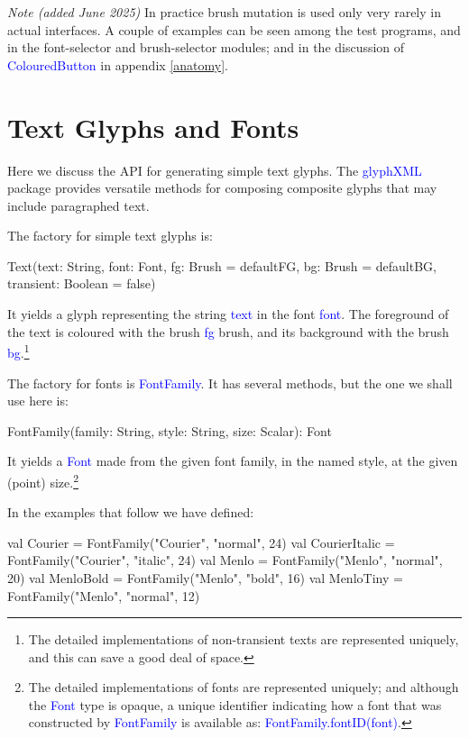 \documentclass[12pt,a4paper]{article}
\def\Scala#1{\textcolor{blue}{\textsf{#1}}}
\let\scalasize=\footnotesize
\def\S#1{\section{#1}}
\begin{document}
\textit{Note (added June 2025)} In practice brush mutation is used only
very rarely in actual interfaces.  A couple of examples can be seen among
the test programs, and in the font-selector and brush-selector
modules; and in the discussion of \Scala{ColouredButton} in appendix \ref{anatomy}.


\clearpage


\S{Text Glyphs and Fonts}
Here we discuss the API for generating simple text glyphs.
{The \textcolor{blue}{\textsf{glyphXML}}
package provides versatile methods for composing composite glyphs that
may include paragraphed text.}

The factory for simple text glyphs is:
\let\scalasize=\footnotesize
\begin{scala}
     Text(text:      String,
          font:      Font,
          fg:        Brush   = defaultFG,
          bg:        Brush   = defaultBG,
          transient: Boolean = false)
\end{scala}

It yields a glyph representing the string \Scala{text} in the font \Scala{font}. The
foreground of the text is coloured with the brush \Scala{fg} brush, and
its background with the brush \Scala{bg}.\footnote{The detailed
implementations of non-transient texts are represented uniquely, and this
can save a good deal of space.}

The factory for fonts is \Scala{FontFamily}. It has several methods, but
the one we shall use here is:
\begin{scala}
  FontFamily(family: String, style: String, size: Scalar): Font
\end{scala}
It yields a \Scala{Font} made from the given font family, in the named style, at
the given (point) size.\footnote{The detailed implementations of fonts
are represented uniquely; and although the \Scala{Font} type is
opaque, a unique identifier indicating how a font that was
constructed by \Scala{FontFamily} is available as:
\Scala{FontFamily.fontID(font)}.}

In the examples that follow we have defined:
\begin{scala}
    val Courier         = FontFamily("Courier", "normal", 24)
    val CourierItalic   = FontFamily("Courier", "italic", 24)
    val Menlo           = FontFamily("Menlo", "normal", 20)
    val MenloBold       = FontFamily("Menlo", "bold", 16)
    val MenloTiny       = FontFamily("Menlo", "normal", 12)
\end{scala}
\end{document}
